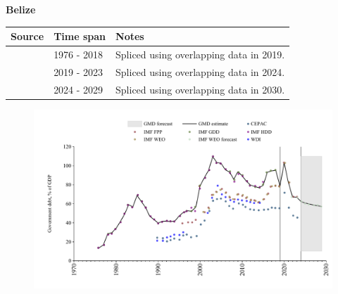 \documentclass[12pt,a4paper,landscape]{article}
\begin{document}
\begin{adjustbox}{max totalsize={\paperwidth}{\paperheight},center}
\begin{minipage}[t][\textheight][t]{\textwidth}
\vspace*{0.5cm}
{}
\begin{center}
{\Large\bfseries Belize}
\end{center}
\vspace{0.5cm}
\begin{table}[H]
\centering
\small
\begin{tabular}{|l|l|l|}
\hline
\textbf{Source} & \textbf{Time span} & \textbf{Notes} \\
\hline
\rowcolor{white}\cite{IMF_GDD}& 1976 - 2018 &Spliced using overlapping data in 2019.\\
\rowcolor{lightgray}\cite{IMF_FPP}& 2019 - 2023 &Spliced using overlapping data in 2024.\\
\rowcolor{white}\cite{IMF_WEO_forecast}& 2024 - 2029 &Spliced using overlapping data in 2030.\\
\hline
\end{tabular}
\end{table}
\begin{figure}[H]
\centering
\includegraphics[width=\textwidth,height=0.6\textheight,keepaspectratio]{graphs/BLZ_govdebt_GDP.pdf}
\end{figure}
\end{minipage}
\end{adjustbox}
\end{document}
